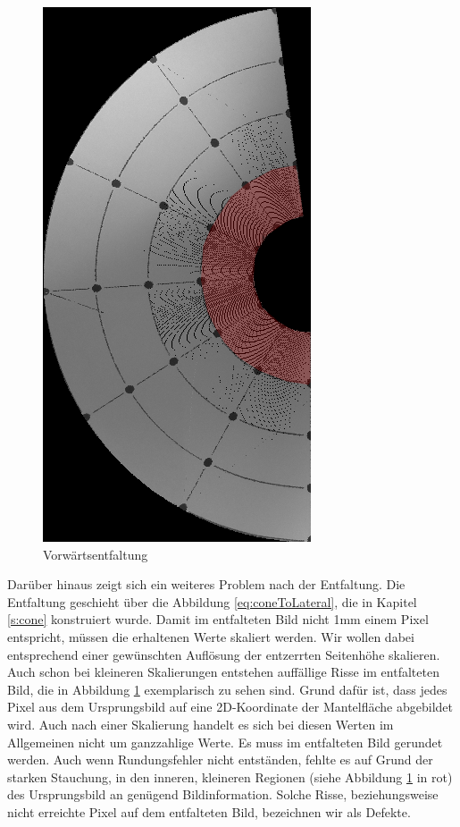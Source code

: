 \begin{figure}[!htb]
	\centering
	\includegraphics[angle=-90, width=.7\textwidth]{images/coneRaspUnWarpForwardHigh.png}
	\caption{Vorwärtsentfaltung}
	\label{fig:forwardHoles}
\end{figure}

Darüber hinaus zeigt sich ein weiteres Problem nach der Entfaltung. Die Entfaltung geschieht über die Abbildung \ref{eq:coneToLateral}, die in Kapitel \ref{s:cone} konstruiert wurde. 
Damit im entfalteten Bild nicht 1mm einem Pixel entspricht, müssen die erhaltenen Werte skaliert werden. Wir wollen dabei entsprechend einer gewünschten Auflösung der entzerrten Seitenhöhe skalieren. 
Auch schon bei kleineren Skalierungen entstehen auffällige Risse im entfalteten Bild, die in Abbildung \ref{fig:forwardHoles} exemplarisch zu sehen sind. Grund dafür ist, dass jedes Pixel aus dem Ursprungsbild auf eine 2D-Koordinate der Mantelfläche abgebildet wird. Auch nach einer Skalierung handelt es sich bei diesen Werten im Allgemeinen nicht um ganzzahlige Werte. Es muss im entfalteten Bild gerundet werden. Auch wenn Rundungsfehler nicht entständen, fehlte es auf Grund der starken Stauchung, in den inneren, kleineren Regionen (siehe Abbildung \ref{fig:forwardHoles} in rot) des Ursprungsbild an genügend Bildinformation. Solche Risse, beziehungsweise nicht erreichte Pixel auf dem entfalteten Bild, bezeichnen wir als Defekte. 

